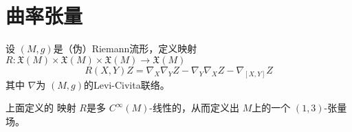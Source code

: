 \documentclass[../../几何与拓扑.tex]{subfiles}
\begin{document}
\section{曲率张量}


\begin{definition}
    设 \(  \left( M,g \right)   \)是（伪）Riemann流形，定义映射 \(  R: \mathfrak{X}\left( M \right)\times \mathfrak{X}\left( M \right)\times \mathfrak{X}\left( M \right)\to \mathfrak{X}\left( M \right)      \) \[
    R\left( X,Y \right)Z =   \nabla _{X}  \nabla _{Y} Z - \nabla _{Y}  \nabla _{X} Z - \nabla _{\left[ X,Y \right] }Z 
    \]  其中 \(   \nabla   \)为 \(  \left( M,g \right)   \)的Levi-Civita联络。  
\end{definition}

\begin{proposition}
    上面定义的 映射 \(  R  \)是多 \(  C^{\infty}\left( M \right)   \)-线性的，从而定义出   \(  M  \)上的一个 \(  \left( 1,3 \right)   \)-张量场。  
\end{proposition}
\end{document}
